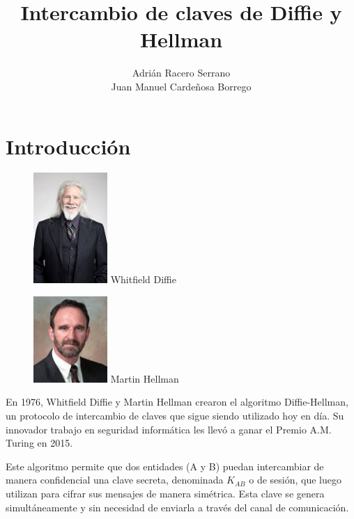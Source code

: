 \documentclass[11pt]{article}
\title{\textbf{\huge Intercambio de claves de Diffie y Hellman}}
\author{Adrián Racero Serrano\\Juan Manuel Cardeñosa Borrego}
\date{}
\begin{document}
\maketitle

\thispagestyle{empty}

\newpage

\setcounter{page}{1}
\tableofcontents

\newpage


\section{Introducción}

\begin{figure} %
    \centering
    \includegraphics[width=0.25\textwidth]{img/Diffie.jpg}
    Whitfield Diffie
    
    \includegraphics[width=0.25\textwidth]{img/Hellman.jpg}
    Martin Hellman
\end{figure}

En 1976, Whitfield Diffie y Martin Hellman crearon el algoritmo Diffie-Hellman, un protocolo de intercambio de claves que sigue siendo utilizado hoy en día. Su innovador trabajo en seguridad informática les llevó a ganar el Premio A.M. Turing en 2015.

Este algoritmo permite que dos entidades (A y B) puedan intercambiar de manera confidencial una clave secreta, denominada $K_{AB}$ o de sesión, que luego utilizan para cifrar sus mensajes de manera simétrica. Esta clave se genera simultáneamente y sin necesidad de enviarla a través del canal de comunicación. 
\end{document}
